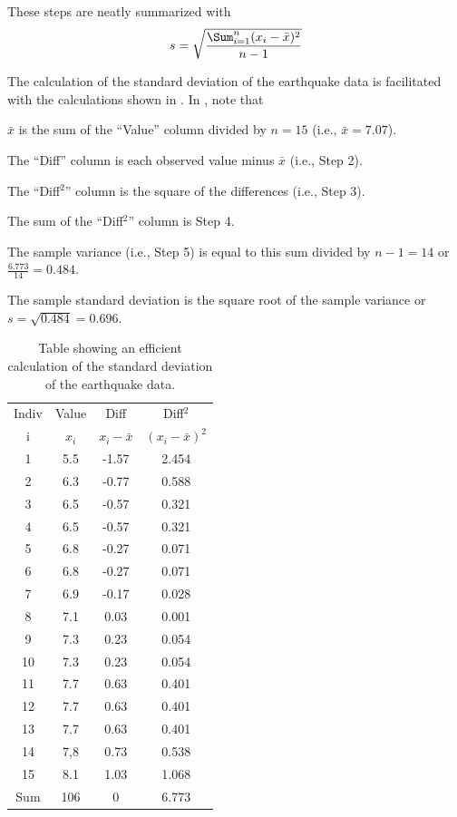 \documentclass[10pt,openany]{book}\usepackage[]{graphicx}\usepackage[]{color}
\begin{document}
These steps are neatly summarized with
\vspace{-6pt}
\begin{equation}
  \label{eqn:SampleSD}
     s = \sqrt{\frac{\Sum_{i=1}^{n}(x_{i}-\bar{x})^{2}}{n-1}}
\end{equation}

The calculation of the standard deviation of the earthquake data  is facilitated with the calculations shown in . In , note that
\vspace{-6pt}
\begin{Itemize}
  \item $\bar{x}$ is the sum of the ``Value'' column divided by $n=15$ (i.e., $\bar{x}=7.07$).
  \item The ``Diff'' column is each observed value minus $\bar{x}$ (i.e., Step 2).
  \item The ``Diff$^2$'' column is the square of the differences (i.e., Step 3).
  \item The sum of the ``Diff$^2$'' column is Step 4.
  \item The sample variance (i.e., Step 5) is equal to this sum divided by $n-1=14$ or $\frac{6.773}{14}=0.484$.
  \item The sample standard deviation is the square root of the sample variance or $s=\sqrt{0.484}=0.696$.
\end{Itemize}

\begin{table}[htbp]
  \caption{Table showing an efficient calculation of the standard deviation of the earthquake data.}
  \label{tab:SDCalc}
    \centering
    \begin{tabular}{cccc}
\hline\hline
Indiv & Value & Diff & Diff$^2$ \\
i & $x_{i}$ & $x_{i}-\bar{x}$ & $(x_{i}-\bar{x})^{2}$ \\
\hline
1 & 5.5 & -1.57 & 2.454 \\
2 & 6.3 & -0.77 & 0.588 \\
3 & 6.5 & -0.57 & 0.321 \\
4 & 6.5 & -0.57 & 0.321 \\
5 & 6.8 & -0.27 & 0.071 \\
6 & 6.8 & -0.27 & 0.071 \\
7 & 6.9 & -0.17 & 0.028 \\
8 & 7.1 & 0.03 & 0.001 \\
9 & 7.3 & 0.23 & 0.054 \\
10 & 7.3 & 0.23 & 0.054 \\
11 & 7.7 & 0.63 & 0.401 \\
12 & 7.7 & 0.63 & 0.401 \\
13 & 7.7 & 0.63 & 0.401 \\
14 & 7,8 & 0.73 & 0.538 \\
15 & 8.1 & 1.03 & 1.068 \\
\hline
Sum & 106 & 0 & 6.773 \\
\hline\hline
    \end{tabular}
\end{table}
\end{document}
